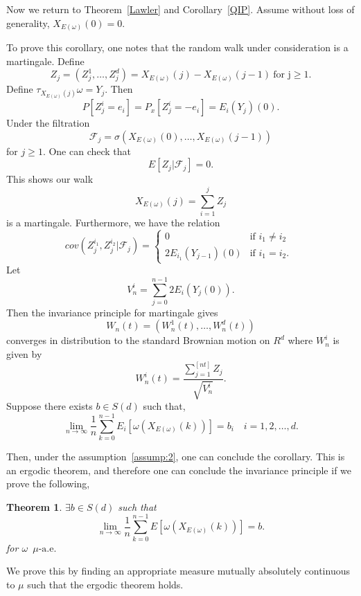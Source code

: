 \documentclass[final]{aomart}
\def\mathscr#1{#1}%
\def\mathbb#1{#1}%
\theoremstyle{plain}
\newtheorem{theorem}{Theorem}[section]
\theoremstyle{definition}
\theoremstyle{remark}
\begin{document}
Now we return to Theorem~\ref{Lawler} and Corollary~\ref{QIP}. Assume without loss of generality, $X_{\mathscr{E}(\omega)}(0) = 0$. 

To prove this corollary, one notes that the random walk under consideration is a martingale. Define \[
Z_j = ( Z_j^1,\dots,Z_j^d) = X_{\mathscr{E}(\omega)}(j) - X_{\mathscr{E}(\omega)}(j-1)~\text{for j}\geq 1. 
\] Define $\tau_{X_{\mathscr{E}(\omega)}(j)} \omega = Y_j$. Then \[
\mathbb{P}[Z_j^{i} = e_i] = \mathbb{P}_x[Z_j^i = -e_i] = \mathscr{E}_i(Y_j)(0).
\]
Under the filtration \[
\mathcal{F}_j= \sigma(X_{\mathscr{E}(\omega)}(0),\dots,X_{\mathscr{E}(\omega)}(j-1)) 
\] for $j \geq 1$. One can check that \[
\mathbb{E}[Z_j|\mathcal{F}_j]=0.
\]
This shows our walk \[
X_{\mathscr{E}(\omega)}(j) = \sum_{i=1}^{j} Z_j  
\]
is a martingale. Furthermore, we have the relation \[
cov(Z_j^{i_1}, Z_j^{i_2}|\mathcal{F}_j) = \begin{cases}
0 & \text{if $i_1\neq i_2$ }\\
2\mathscr{E}_{i_1}(Y_{j-1})(0) & \text{if $i_1= i_2$}.
\end{cases}
\]
Let \[
V_n^i = \sum_{j=0}^{n-1}2 \mathscr{E}_i(Y_j(0)). 
\]
Then the invariance principle for martingale gives \[
W_n(t) = (W_n^1(t),\dots ,W_n^d(t))
\]
converges in distribution to the standard Brownian motion on $\mathbb{R}^d$ where $W_n^{i}$ is given by \[
 W_n^i(t) =\frac{\sum _{j=1}^{[nt]} Z_j}{\sqrt{V_n^i}}. 
\]
Suppose there exists $b \in S(d)$ such that, 
\[ 
\lim_{n\to \infty } \frac{1}{n } \sum_{k=0}^{n-1} \mathscr{E}_i[\omega(X_{\mathscr{E}(\omega)}(k))]= b_i \quad i=1,2,\dots, d.
\]

Then, under the assumption~\ref{assump:2}, one can conclude the corollary. This is an ergodic theorem, and therefore one can conclude the invariance principle if we prove the following,  \begin{theorem}
    $\exists b \in S(d)$ such that \[
\lim_{n\to \infty } \frac{1}{n } \sum_{k=0}^{n-1} \mathscr{E}[\omega(X_{\mathscr{E}(\omega)}(k))] = b.
\]
for $\omega$~$\mu\text{-a.e.}$
\end{theorem}
We prove this by finding an appropriate measure mutually absolutely continuous to $\mu$ such that the ergodic theorem holds.
\end{document}
